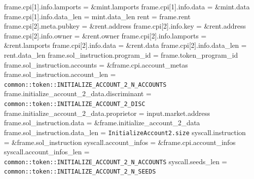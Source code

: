 \begin{algorithm}
\begin{algorithmic}
  \STATE frame.cpi[1].info.lamports = \&mint.lamports
  \STATE frame.cpi[1].info.data = \&mint.data
  \STATE frame.cpi[1].info.data\_len = mint.data\_len
  \STATE rent = frame.rent
  \STATE frame.cpi[2].meta.pubkey = \&rent.address
  \STATE frame.cpi[2].info.key = \&rent.address
  \STATE frame.cpi[2].info.owner = \&rent.owner
  \STATE frame.cpi[2].info.lamports = \&rent.lamports
  \STATE frame.cpi[2].info.data = \&rent.data
  \STATE frame.cpi[2].info.data\_len = rent.data\_len
  \STATE frame.sol\_instruction.program\_id = frame.token\_program\_id
  \STATE frame.sol\_instruction.accounts = \&frame.cpi.account\_metas
  \STATE frame.sol\_instruction.account\_len =
    \texttt{common::token::INITIALIZE\_ACCOUNT\_2\_N\_ACCOUNTS}
  \STATE frame.initialize\_account\_2\_data.discriminant =
    \texttt{common::token::INITIALIZE\_ACCOUNT\_2\_DISC}
  \STATE frame.initialize\_account\_2\_data.proprietor = input.market.address
  \STATE frame.sol\_instruction.data = \&frame.initialize\_account\_2\_data
  \STATE frame.sol\_instruction.data\_len = \texttt{InitializeAccount2.size}
  \STATE syscall.instruction = \&frame.sol\_instruction
  \STATE syscall.account\_infos = \&frame.cpi.account\_infos
  \STATE syscall.account\_infos\_len =
    \texttt{common::token::INITIALIZE\_ACCOUNT\_2\_N\_ACCOUNTS}
  \STATE syscall.seeds\_len = \texttt{common::token::INITIALIZE\_ACCOUNT\_2\_N\_SEEDS}
  \STATE {}
\ENDFUNCTION
\end{algorithmic}
\end{algorithm}
